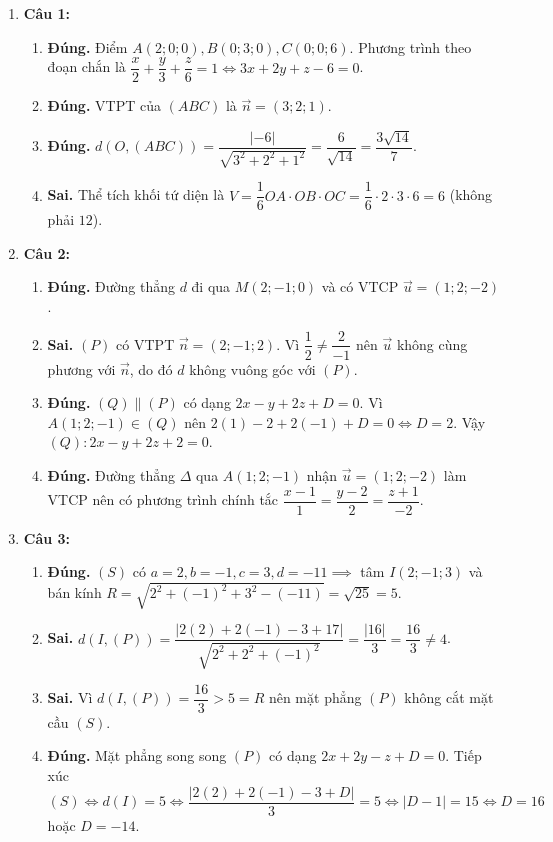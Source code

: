 \documentclass[12pt,a4paper]{article}
\begin{document}
\begin{enumerate}
\item \textbf{Câu 1:}
\begin{enumerate}[label=\alph*)]
    \item \textbf{Đúng.} Điểm $A(2;0;0), B(0;3;0), C(0;0;6)$. Phương trình theo đoạn chắn là $\dfrac{x}{2} + \dfrac{y}{3} + \dfrac{z}{6} = 1 \iff 3x + 2y + z - 6 = 0$.
    \item \textbf{Đúng.} VTPT của $(ABC)$ là $\vec{n} = (3; 2; 1)$.
    \item \textbf{Đúng.} $d(O, (ABC)) = \dfrac{|-6|}{\sqrt{3^2 + 2^2 + 1^2}} = \dfrac{6}{\sqrt{14}} = \dfrac{3\sqrt{14}}{7}$.
    \item \textbf{Sai.} Thể tích khối tứ diện là $V = \dfrac{1}{6} OA \cdot OB \cdot OC = \dfrac{1}{6} \cdot 2 \cdot 3 \cdot 6 = 6$ (không phải $12$).
\end{enumerate}

\item \textbf{Câu 2:}
\begin{enumerate}[label=\alph*)]
    \item \textbf{Đúng.} Đường thẳng $d$ đi qua $M(2; -1; 0)$ và có VTCP $\vec{u} = (1; 2; -2)$.
    \item \textbf{Sai.} $(P)$ có VTPT $\vec{n} = (2; -1; 2)$. Vì $\dfrac{1}{2} \ne \dfrac{2}{-1}$ nên $\vec{u}$ không cùng phương với $\vec{n}$, do đó $d$ không vuông góc với $(P)$.
    \item \textbf{Đúng.} $(Q) \parallel (P)$ có dạng $2x - y + 2z + D = 0$. Vì $A(1; 2; -1) \in (Q)$ nên $2(1) - 2 + 2(-1) + D = 0 \iff D = 2$. Vậy $(Q): 2x - y + 2z + 2 = 0$.
    \item \textbf{Đúng.} Đường thẳng $\Delta$ qua $A(1; 2; -1)$ nhận $\vec{u} = (1; 2; -2)$ làm VTCP nên có phương trình chính tắc $\dfrac{x-1}{1} = \dfrac{y-2}{2} = \dfrac{z+1}{-2}$.
\end{enumerate}

\item \textbf{Câu 3:}
\begin{enumerate}[label=\alph*)]
    \item \textbf{Đúng.} $(S)$ có $a = 2, b = -1, c = 3, d = -11 \implies$ tâm $I(2; -1; 3)$ và bán kính $R = \sqrt{2^2 + (-1)^2 + 3^2 - (-11)} = \sqrt{25} = 5$.
    \item \textbf{Sai.} $d(I, (P)) = \dfrac{|2(2) + 2(-1) - 3 + 17|}{\sqrt{2^2 + 2^2 + (-1)^2}} = \dfrac{|16|}{3} = \dfrac{16}{3} \ne 4$.
    \item \textbf{Sai.} Vì $d(I, (P)) = \dfrac{16}{3} > 5 = R$ nên mặt phẳng $(P)$ không cắt mặt cầu $(S)$.
    \item \textbf{Đúng.} Mặt phẳng song song $(P)$ có dạng $2x + 2y - z + D = 0$. Tiếp xúc $(S) \iff d(I) = 5 \iff \dfrac{|2(2) + 2(-1) - 3 + D|}{3} = 5 \iff |D - 1| = 15 \iff D = 16$ hoặc $D = -14$.
\end{enumerate}


\end{enumerate}
\end{document}
